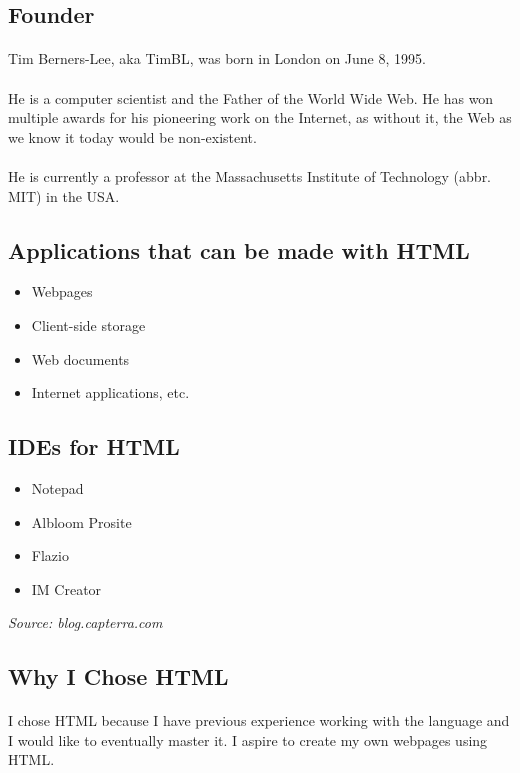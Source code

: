 \documentclass{article}
\begin{document}
\subsection*{Founder}
\paragraph{}Tim Berners-Lee, aka TimBL, was born in London on June 8, 1995.
\paragraph{}He is a computer scientist and the Father of the World Wide Web.
He has won multiple awards for his pioneering work on the Internet, as without it, the Web as we know it today would be non-existent.
\paragraph{}He is currently a professor at the Massachusetts Institute of Technology (abbr. MIT) in the USA.
\subsection*{Applications that can be made with HTML}
\begin{itemize}
	\item Webpages
	\item Client-side storage
	\item Web documents
	\item Internet applications, etc.
\end{itemize}
\subsection*{IDEs for HTML}
\begin{itemize}
	\item Notepad
	\item Albloom Prosite
	\item Flazio
	\item IM Creator
\end{itemize}
\textit{Source: blog.capterra.com}
\subsection*{Why I Chose HTML}
\paragraph{}I chose HTML because I have previous experience working with the language and I would like to eventually master it.
I aspire to create my own webpages using HTML.
\end{document}
